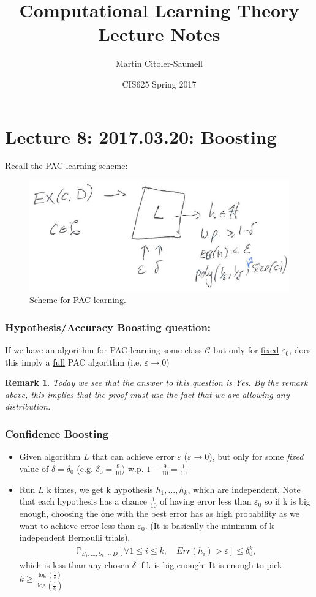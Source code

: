 \documentclass[12pt, letterpaper]{article}
\title{Computational Learning Theory Lecture Notes}
\author{Martin Citoler-Saumell}
\date{CIS625 Spring 2017}
\numberwithin{equation}{section} %
\newcommand{\ul}{\underline}
\newcommand{\mb}{\mathbb}
\newcommand{\mc}{\mathcal}
\newcommand{\ve}{\varepsilon}
\newtheorem{remark}[theorem]{Remark}
\theoremstyle{definition}
\theoremstyle{remark}
\begin{document}
\section{Lecture 8: 2017.03.20: Boosting}
Recall the PAC-learning scheme:
\begin{figure}[H]
\centering
\includegraphics[width=0.6\linewidth]{img/pac-learning.png}
\caption{Scheme for PAC learning.}
\end{figure}


\subsubsection*{Hypothesis/Accuracy Boosting question:}
If we have an algorithm for PAC-learning some class $\mc C$ but only for \ul{fixed} $\ve_0$, does this imply a \ul{full} PAC algorithm (i.e. $\ve\to 0$)
\begin{remark}
Today we see that the answer to this question is Yes. By the remark above, this implies that the proof must use the fact that we are allowing \emph{any} distribution.
\end{remark}

\subsubsection{Confidence Boosting}
\begin{itemize}
\item Given algorithm $L$ that can achieve error $\ve$ ($\ve\to0$), but only for some \emph{fixed} value of $\delta=\delta_0$ (e.g. $\delta_0=\frac9{10}$) w.p. $1 - \frac9{10} = \frac1{10}$
\item Run $L$ k times, we get k hypothesis $h_1,\ldots,h_k$, which are independent. Note that each hypothesis has a chance $\frac1{10}$ of having error less than $\ve_0$ so if k is big enough, choosing the one with the best error has as high probability as we want to achieve error less than $\ve_0$. (It is basically the minimum of k independent Bernoulli trials).
\begin{align}
\mb P_{S_1,\ldots, S_k\sim D}\left[\forall 1\leq i \leq k, \quad Err(h_i)>\ve\right]\leq \delta_0^k,
\end{align}
which is less than any chosen $\delta$ if k is big enough. It is enough to pick $k\geq \frac{\log\left(\frac1\delta\right)}{\log\left(\frac1{\delta_0}\right)}$
\end{itemize}
\end{document}
